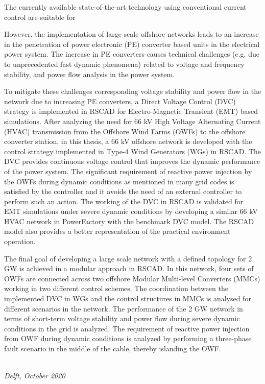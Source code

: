 The currently available state-of-the-art technology using conventional current control are suitable for 


However, the implementation of large scale offshore networks leads to an increase in the penetration of power electronic (PE) converter based units in the electrical power system. The increase in PE converters causes technical challenges (e.g. due to unprecedented fast dynamic phenomena) related to voltage and frequency stability, and power flow analysis in the power system.

 
To mitigate these challenges corresponding voltage stability and power flow in the network due to increasing PE converters, a Direct Voltage Control (DVC) strategy is implemented in RSCAD for Electro-Magnetic Transient (EMT) based simulations. After analyzing the need for 66 kV High Voltage Alternating Current (HVAC) transmission from the Offshore Wind Farms (OWFs) to the offshore converter station, in this thesis, a 66 kV offshore network is developed with the control strategy implemented in Type-4 Wind Generators (WGs) in RSCAD. The DVC provides continuous voltage control that improves the dynamic performance of the power system. The significant requirement of reactive power injection by the OWFs during dynamic conditions as mentioned in many grid codes is satisfied by the controller and it avoids the need of an external controller to perform such an action. The working of the DVC in RSCAD is validated for EMT simulations under severe dynamic conditions by developing a similar 66 kV HVAC network in PowerFactory with the benchmark DVC model. The RSCAD model also provides a better representation of the practical environment operation. 

The final goal of developing a large scale network with a defined topology for 2 GW is achieved in a modular approach in RSCAD. In this network, four sets of OWFs are connected across two offshore Modular Multi-level Converters (MMCs) working in two different control schemes. The coordination between the implemented DVC in WGs and the control structures in MMCs is analysed for different scenarios in the network. The performance of the 2 GW network in terms of short-term voltage stability and power flow during severe dynamic conditions in the grid is analyzed. The requirement of reactive power injection from OWF during dynamic conditions is analyzed by performing a three-phase fault scenario in the middle of the cable, thereby islanding the OWF.

\begin{flushright}
{\makeatletter\itshape
    \@author \\
    Delft, October 2020
\makeatother}
\end{flushright}


